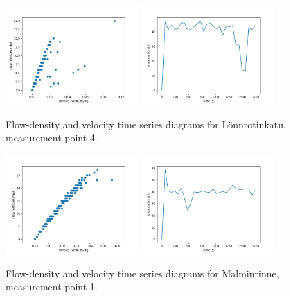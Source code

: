 \documentclass[english, 12pt, a4paper, elec, utf8, pdfa, online]{aaltothesis}
\begin{document}
\clearpage
\begin{figure}[ht!]
    \centering
    \includegraphics[width=0.45\textwidth]{graphs/Lonnrotinkatu_4_flw_dns.png}
    \includegraphics[width=0.45\textwidth]{graphs/Lonnrotinkatu_4_spd_time_6.png}
    \caption{Flow-density and velocity time series diagrams for Lönnrotinkatu, measurement point 4.}
\end{figure}
\begin{figure}[ht!]
    \centering
    \includegraphics[width=0.45\textwidth]{graphs/Malminrinne_1_flw_dns.png}
    \includegraphics[width=0.45\textwidth]{graphs/Malminrinne_1_spd_time_6.png}
    \caption{Flow-density and velocity time series diagrams for Malminrinne, measurement point 1.}
\end{figure}
\end{document}
